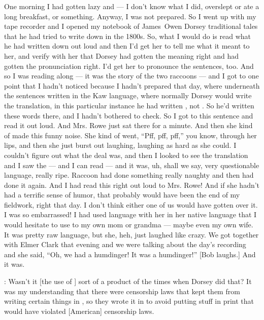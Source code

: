 \documentclass[output=paper]{LSP/langsci}
\begin{document}
One morning I had gotten lazy and --- I don't know what I did, overslept or ate a long breakfast, or something. Anyway, I was not prepared. So I went up with my tape recorder and I opened my notebook of James~Owen Dorsey traditional tales that he had tried to write down in the 1800s. So, what I would do is read what he had written down out loud and then I'd get her to tell me what it meant to her, and verify with her that Dorsey had gotten the meaning right and had gotten the pronunciation right. I'd get her to pronounce the sentences, too. And so I was reading along --- it was the story of the two raccoons --- and I got to one point that I hadn't noticed because I hadn't prepared that day, where underneath the sentences written in the Kaw language, where normally Dorsey would write the  translation, in this particular instance he had written , not . So he'd written these  words there, and I hadn't bothered to check. So I got to this sentence and read it out loud. And Mrs. Rowe just sat there for a minute. And then she kind of made this funny noise. She kind of went, ``Pff, pff, pff,'' you know, through her lips, and then she just burst out laughing, laughing as hard as she could. I couldn't figure out what the deal was, and then I looked to see the translation and I saw the  --- and I can read  --- and it was, uh, shall we say, very questionable language, really ripe. Raccoon had done something really naughty and then had done it again. And I had read this right out loud to Mrs. Rowe! And if she hadn't had a terrific sense of humor, that probably would have been the end of my fieldwork, right that day. I don't think either one of us would have gotten over it. I was so embarrassed! I had used language with her in her native language that I would hesitate to use to my own mom or grandma --- maybe even my own wife. It was pretty raw language, but she, heh, just laughed like crazy. We got together with Elmer Clark that evening and we were talking about the day's recording and she said, ``Oh, we had a humdinger! It was a humdinger!'' [Bob laughs.] And it was.

: Wasn't it [the use of ] sort of a product of the times when Dorsey did that? It was my understanding that there were censorship laws that kept them from writing certain things in , so they wrote it in  to avoid putting stuff in print that would have violated [American] censorship laws.
\end{document}
